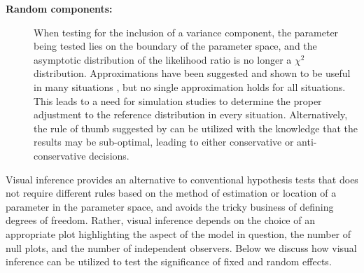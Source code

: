 \documentclass[12pt]{article}
\newcommand{\alnote}[1]{\todo[inline,color=green!40]{#1}} %
\newcommand{\hhnote}[1]{\todo[inline,color=orange!40]{#1}}
\begin{document}
\begin{description}
%
\item[\bf Random components: ] When testing for the inclusion of a variance component, the parameter being tested lies on the boundary of the parameter space, and the asymptotic distribution of the likelihood ratio is no longer a $\chi^2$ distribution. Approximations have been suggested and shown to be useful in many situations \citep{Stram:1994wd, Morrell:1998ua}, but no single approximation holds for all situations. This leads to a need for simulation studies to determine the proper adjustment to the reference distribution in every situation. Alternatively, the rule of thumb suggested by \citeauthor{Stram:1994wd} can be utilized with the knowledge that the results may be sub-optimal, leading to either conservative or anti-conservative decisions. 
\end{description}


Visual inference provides an alternative to conventional hypothesis tests that does not require different rules based on the method of estimation or location of a parameter in the parameter space, and avoids the tricky business of defining degrees of freedom. Rather, visual inference depends on the choice of an appropriate plot highlighting the aspect of the model in question, the number of null plots, and the number of independent observers. Below we discuss how visual inference can be utilized to test the significance of fixed and random effects.
\end{document}
